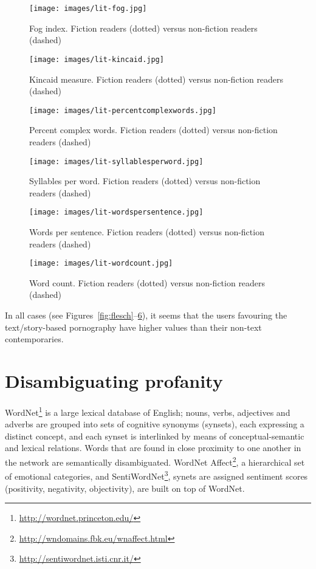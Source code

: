 \documentclass[letterpaper]{article}
\begin{document}
\begin{figure}[!h]
\centering
\texttt{[image: images/lit-fog.jpg]}
\caption{Fog index. Fiction readers (dotted) versus non-fiction readers (dashed)}
\label{fig:fog}
\end{figure}

\begin{figure}[!htb]
\centering
\texttt{[image: images/lit-kincaid.jpg]}
\caption{Kincaid measure. Fiction readers (dotted) versus non-fiction readers (dashed)}
\label{fig:kincaid}
\end{figure}

\begin{figure}[!h]
\centering
\texttt{[image: images/lit-percentcomplexwords.jpg]}
\caption{Percent complex words. Fiction readers (dotted) versus non-fiction readers (dashed)}
\label{fig:percentcomplex}
\end{figure}

\begin{figure}[!h]
\centering
\texttt{[image: images/lit-syllablesperword.jpg]}
\caption{Syllables per word. Fiction readers (dotted) versus non-fiction readers (dashed)}
\label{fig:syllables}
\end{figure}

\begin{figure}[!h]
\centering
\texttt{[image: images/lit-wordspersentence.jpg]}
\caption{Words per sentence. Fiction readers (dotted) versus non-fiction readers (dashed)}
\label{fig:wordpersent}
\end{figure}

\begin{figure}[!h]
\centering
\texttt{[image: images/lit-wordcount.jpg]}
\caption{Word count. Fiction readers (dotted) versus non-fiction readers (dashed)}
\label{fig:wordcount}
\end{figure}

In all cases (see Figures~\ref{fig:flesch}--\ref{fig:wordcount}), it
seems that the users favouring the text/story-based pornography have
higher values than their non-text contemporaries.


\section{Disambiguating profanity}

WordNet\footnote{\url{http://wordnet.princeton.edu/}} is a large
lexical database of English; nouns, verbs, adjectives and adverbs are
grouped into sets of cognitive synonyms (synsets), each expressing a
distinct concept, and each synset is interlinked by means of
conceptual-semantic and lexical relations. Words that are found in
close proximity to one another in the network are semantically
disambiguated. WordNet
Affect\footnote{\url{http://wndomains.fbk.eu/wnaffect.html}}, a
hierarchical set of emotional categories, and
SentiWordNet\footnote{\url{http://sentiwordnet.isti.cnr.it/}}, synets
are assigned sentiment scores (positivity, negativity, objectivity),
are built on top of WordNet.
\end{document}
